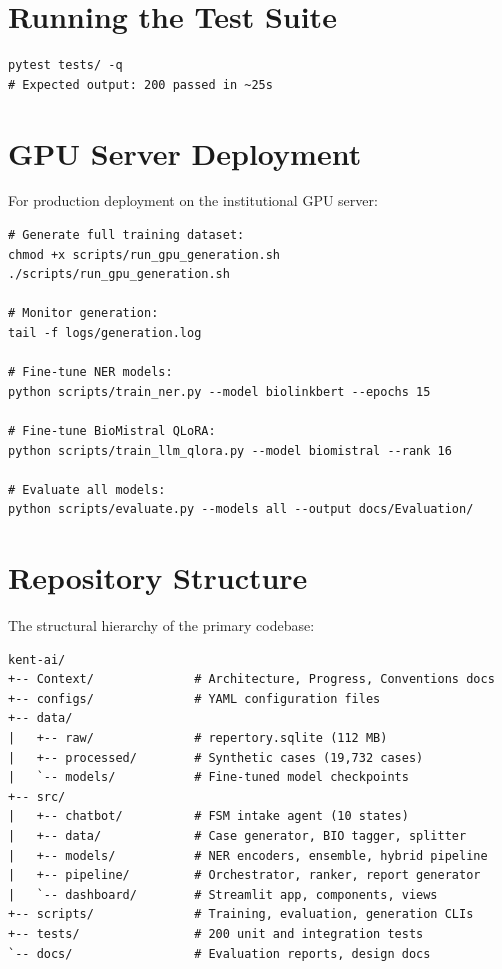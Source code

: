 \section{Running the Test Suite}

\begin{lstlisting}[style=python, caption={Test Suite Execution}]
pytest tests/ -q
# Expected output: 200 passed in ~25s
\end{lstlisting}


\section{GPU Server Deployment}

For production deployment on the institutional GPU server:

\begin{lstlisting}[style=python, caption={GPU Server Deployment}]
# Generate full training dataset:
chmod +x scripts/run_gpu_generation.sh
./scripts/run_gpu_generation.sh

# Monitor generation:
tail -f logs/generation.log

# Fine-tune NER models:
python scripts/train_ner.py --model biolinkbert --epochs 15

# Fine-tune BioMistral QLoRA:
python scripts/train_llm_qlora.py --model biomistral --rank 16

# Evaluate all models:
python scripts/evaluate.py --models all --output docs/Evaluation/
\end{lstlisting}


\section{Repository Structure}

The structural hierarchy of the primary codebase:

\begin{verbatim}
kent-ai/
+-- Context/              # Architecture, Progress, Conventions docs
+-- configs/              # YAML configuration files
+-- data/
|   +-- raw/              # repertory.sqlite (112 MB)
|   +-- processed/        # Synthetic cases (19,732 cases)
|   `-- models/           # Fine-tuned model checkpoints
+-- src/
|   +-- chatbot/          # FSM intake agent (10 states)
|   +-- data/             # Case generator, BIO tagger, splitter
|   +-- models/           # NER encoders, ensemble, hybrid pipeline
|   +-- pipeline/         # Orchestrator, ranker, report generator
|   `-- dashboard/        # Streamlit app, components, views
+-- scripts/              # Training, evaluation, generation CLIs
+-- tests/                # 200 unit and integration tests
`-- docs/                 # Evaluation reports, design docs
\end{verbatim}
